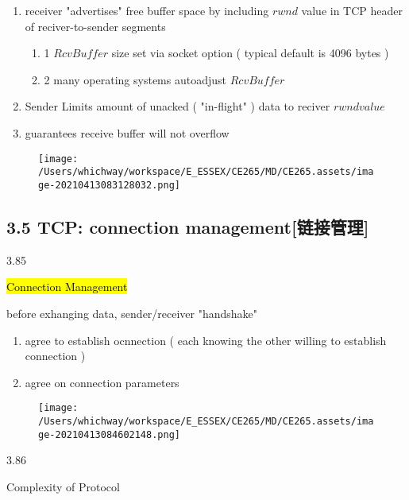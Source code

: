 \documentclass[
]{article}
\begin{document}
\begin{enumerate}
\def\labelenumi{\arabic{enumi}.}
\item
  receiver "advertises" free buffer space by including \(rwnd\) value in
  TCP header of reciver-to-sender segments

  \begin{enumerate}
  \def\labelenumii{\arabic{enumii}.}
  \item
    1 \(RcvBuffer\) size set via socket option ( typical default is 4096
    bytes )
  \item
    2 many operating systems autoadjust \(RcvBuffer\)
  \end{enumerate}
\item
  Sender Limits amount of unacked ( "in-flight" ) data to reciver
  \(rwnd value\)
\item
  guarantees receive buffer will not overflow
\end{enumerate}

\begin{figure}
\centering
\texttt{[image: /Users/whichway/workspace/E\_ESSEX/CE265/MD/CE265.assets/image-20210413083128032.png]}
\caption{}
\end{figure}

\hypertarget{35-tcp-connection-managementux94feux63a5ux7ba1ux7406}{%
\subsection{3.5 TCP: connection
management{[}链接管理{]}}\label{35-tcp-connection-managementux94feux63a5ux7ba1ux7406}}

3.85

\hl{Connection Management}

before exhanging data, sender/receiver "handshake"

\begin{enumerate}
\def\labelenumi{\arabic{enumi}.}
\item
  agree to establish ocnnection ( each knowing the other willing to
  establish connection )
\item
  agree on connection parameters
\end{enumerate}

\begin{figure}
\centering
\texttt{[image: /Users/whichway/workspace/E\_ESSEX/CE265/MD/CE265.assets/image-20210413084602148.png]}
\caption{}
\end{figure}

3.86

Complexity of Protocol
\end{document}
